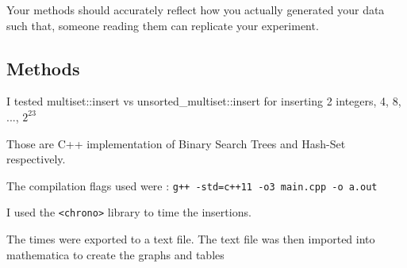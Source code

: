 \documentclass[11pt]{article}
\begin{document}
Your methods should accurately reflect how you actually generated your
data such that, someone reading them can replicate your experiment.

    \subsection{Methods}\label{methods}

I tested multiset::insert vs unsorted\_multiset::insert for inserting 2
integers, 4, 8, ..., \(2^{23}\)

Those are C++ implementation of Binary Search Trees and Hash-Set
respectively.

The compilation flags used were :
\texttt{g++\ -std=c++11\ -o3\ main.cpp\ -o\ a.out}

I used the \texttt{\textless{}chrono\textgreater{}} library to time the
insertions.

The times were exported to a text file. The text file was then imported
into mathematica to create the graphs and tables
\end{document}
